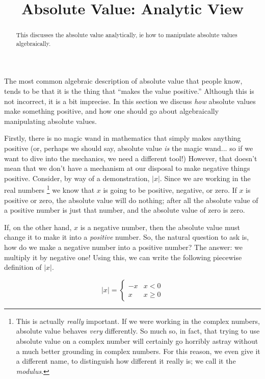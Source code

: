 \documentclass{ximeraXloud}
\title{Absolute Value: Analytic View}
\begin{document}
\begin{abstract}
    This discusses the absolute value analytically, ie how to manipulate absolute values algebraically.
\end{abstract}
\maketitle

The most common algebraic description of absolute value that people know, tends to be that it is the thing that ``makes the value positive.'' Although this is not incorrect, it is a bit imprecise. In this section we discuss \textit{how} absolute values make something positive, and how one should go about algebraically manipulating absolute values.

Firstly, there is no magic wand in mathematics that simply makes anything positive (or, perhaps we should say, absolute value \textit{is} the magic wand... so if we want to dive into the mechanics, we need a different tool!) However, that doesn't mean that we don't have a mechanism at our disposal to make negative things positive. Consider, by way of a demonstration, $|x|$. Since we are working in the real numbers%
\footnote{This is actually \textit{really} important. If we were working in the complex numbers, absolute value behaves \textit{very} differently. So much so, in fact, that trying to use absolute value on a complex number will certainly go horribly astray without a much better grounding in complex numbers. For this reason, we even give it a different name, to distinguish how different it really is; we call it the \textit{modulus}.}
we know that $x$ is going to be positive, negative, or zero. If $x$ is positive or zero, the absolute value will do nothing; after all the absolute value of a positive number is just that number, and the absolute value of zero is zero. 

If, on the other hand, $x$ is a negative number, then the absolute value must change it to make it into a \textit{positive} number. So, the natural question to ask is, how do we make a negative number into a positive number? The answer: we multiply it by negative one! Using this, we can write the following piecewise definition of $|x|$.

\[
    |x| = 
        \begin{cases}
            -x & x < 0 \\
            x & x \geq 0
        \end{cases}
\]
\end{document}
